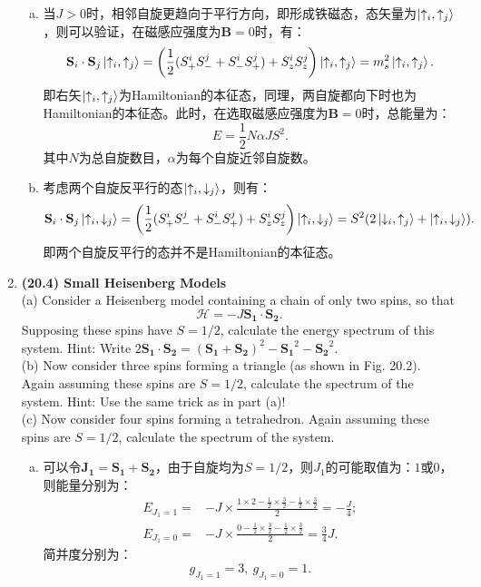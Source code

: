 \documentclass[reqno,a4paper,12pt]{amsart}
\begin{document}
\begin{enumerate}[1.]
\begin{tcolorbox}[breakable, colframe = black, colback = black!5!white]
\begin{enumerate}[(a)]
\item 当$J>0$时，相邻自旋更趋向于平行方向，即形成铁磁态，态矢量为$\ket{\uparrow_i,\uparrow_j}$，则可以验证，在磁感应强度为$\mathbf{B} = 0$时，有：
\[
	\mathbf{S}_i \cdot \mathbf{S}_j \ket{\uparrow_i,\uparrow_j} = \left( \frac{1}{2}(S_+^iS_-^j + S_-^iS_+^j) + S_z^iS_z^j \right) \ket{\uparrow_i,\uparrow_j} = m_s^2 \ket{\uparrow_i,\uparrow_j}.
\]
即右矢$\ket{\uparrow_i,\uparrow_j}$为Hamiltonian的本征态，同理，两自旋都向下时也为Hamiltonian的本征态。此时，在选取磁感应强度为$\mathbf{B} = 0$时，总能量为：
\[
	E = \frac{1}{2}N\alpha JS^2.
\]
其中$N$为总自旋数目，$\alpha$为每个自旋近邻自旋数。

\item 考虑两个自旋反平行的态$\ket{\uparrow_i,\downarrow_j}$，则有：
\[
	\mathbf{S}_i \cdot \mathbf{S}_j \ket{\uparrow_i,\downarrow_j} = \left( \frac{1}{2}(S_+^iS_-^j + S_-^iS_+^j) + S_z^iS_z^j \right) \ket{\uparrow_i,\downarrow_j} = S^2(2\ket{\downarrow_i,\uparrow_j} + \ket{\uparrow_i,\downarrow_j}).
\]
即两个自旋反平行的态并不是Hamiltonian的本征态。

\end{enumerate}
\end{tcolorbox}

\item \textbf{(20.4) Small Heisenberg Models} \\
(a) Consider a Heisenberg model containing a chain of only two spins, so that 
\[
	\mathcal{H} = -J\mathbf{S_1}\cdot\mathbf{S_2}.
\]
Supposing these spins have $S=1/2$, calculate the energy spectrum of this system. Hint: Write $2\mathbf{S_1\cdot S_2} = (\mathbf{S_1} + \mathbf{S_2})^2 - \mathbf{S_1}^2 - \mathbf{S_2}^2$. \\
(b) Now consider three spins forming a triangle (as shown in Fig. 20.2). Again assuming these spins are $S = 1/2$, calculate the spectrum of the system. Hint: Use the same trick as in part (a)! \\
(c) Now consider four spins forming a tetrahedron. Again assuming these spins are $S = 1/2$, calculate the spectrum of the system.
\begin{tcolorbox}[breakable, colframe = black, colback = black!5!white]
\begin{enumerate}[(a)]

\item 可以令$\mathbf{J_1} = \mathbf{S_1}+\mathbf{S_2}$，由于自旋均为$S=1/2$，则$J_1$的可能取值为：$1$或$0$，则能量分别为：
\begin{align*}
	E_{J_1=1} =& -J\times \frac{1\times 2 - \frac{1}{2}\times\frac{3}{2} - \frac{1}{2}\times\frac{3}{2}}{2} = -\frac{J}{4}; \\
	E_{J_1=0} =& -J\times \frac{0 - \frac{1}{2}\times\frac{3}{2} - \frac{1}{2}\times\frac{3}{2}}{2} = \frac{3}{4}J.
\end{align*}
简并度分别为：
\[
	g_{J_1 = 1} = 3, ~ g_{J_1=0} = 1.
\]


\end{enumerate}
\end{tcolorbox}
\end{enumerate}
\end{document}
